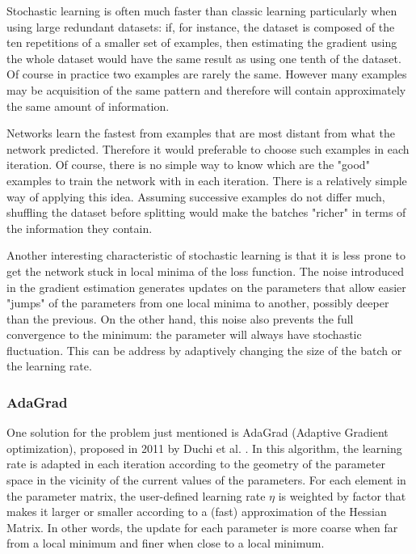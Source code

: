 Stochastic learning is often much faster than classic learning particularly when using large redundant datasets: if, for instance, the dataset is composed of the ten repetitions of a smaller set of examples, then estimating the gradient using the whole dataset would have the same result as using one tenth of the dataset. Of course in practice two examples are rarely the same. However many examples may be acquisition of the same pattern and therefore will contain approximately the same amount of information.

Networks learn the fastest from examples that are most distant from what the network predicted. Therefore it would preferable to choose such examples in each iteration. Of course, there is no simple way to know which are the "good" examples to train the network with in each iteration. There is a relatively simple way of applying this idea. Assuming successive examples do not differ much, shuffling the dataset before splitting would make the batches "richer" in terms of the information they contain.

Another interesting characteristic of stochastic learning is that it is less prone to get the network stuck in local minima of the loss function. The noise introduced in the gradient estimation generates updates on the parameters that allow easier "jumps" of the parameters from one local minima to another, possibly deeper than the previous. On the other hand, this noise also prevents the full convergence to the minimum: the parameter will always have stochastic fluctuation. This can be address by  adaptively changing the size of the batch or the learning rate. \cite{lecun2012efficient}

\subsubsection{AdaGrad}
\label{subsubsec:Adagrad}
One solution for the problem just mentioned is AdaGrad (Adaptive Gradient optimization), proposed in 2011 by Duchi et al. \cite{duchi2011adaptive}. In this algorithm, the learning rate is adapted in each iteration according to the geometry of the parameter space in the vicinity of the current values of the parameters. For each element in the parameter matrix, the user-defined learning rate $\eta$ is weighted by factor that makes it larger or smaller according to a (fast) approximation of the Hessian Matrix. In other words, the update for each parameter is more coarse when far from a local minimum and finer when close to a local minimum.

